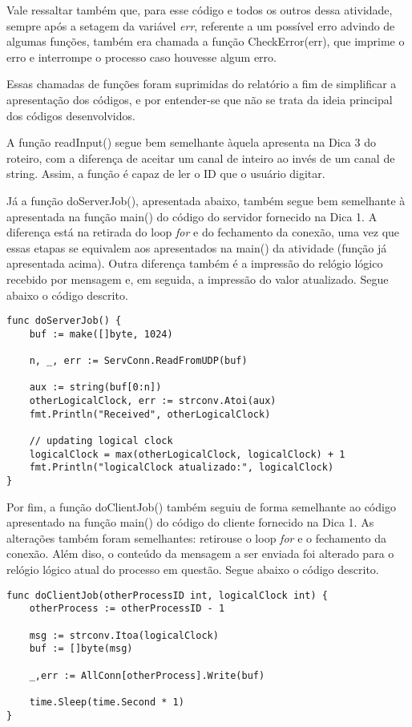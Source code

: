 \documentclass[conference]{IEEEtran}
\begin{document}
	Vale ressaltar também que, para esse código e todos os outros dessa atividade, sempre após a setagem da variável \textit{err}, referente a um possível erro advindo de algumas funções, também era chamada a função CheckError(err), que imprime o erro e interrompe o processo caso houvesse algum erro.
	
	Essas chamadas de funções foram suprimidas do relatório a fim de simplificar a apresentação dos códigos, e por entender-se que não se trata da ideia principal dos códigos desenvolvidos.
	
	A função readInput() segue bem semelhante àquela apresenta na Dica 3 do roteiro, com a diferença de aceitar um canal de inteiro ao invés de um canal de string. Assim, a função é capaz de ler o ID que o usuário digitar.
	
	Já a função doServerJob(), apresentada abaixo, também segue bem semelhante à apresentada na função main() do código do servidor fornecido na Dica 1. A diferença está na retirada do loop \textit{for} e do fechamento da conexão, uma vez que essas etapas se equivalem aos apresentados na main() da atividade (função já apresentada acima). Outra diferença também é a impressão do relógio lógico recebido por mensagem e, em seguida, a impressão do valor atualizado. Segue abaixo o código descrito.

\begin{lstlisting}
func doServerJob() {
	buf := make([]byte, 1024)

	n, _, err := ServConn.ReadFromUDP(buf)

	aux := string(buf[0:n])
	otherLogicalClock, err := strconv.Atoi(aux)
	fmt.Println("Received", otherLogicalClock)
	
	// updating logical clock
	logicalClock = max(otherLogicalClock, logicalClock) + 1
	fmt.Println("logicalClock atualizado:", logicalClock)
}
\end{lstlisting}

	Por fim, a função doClientJob() também seguiu de forma semelhante ao código apresentado na função main() do código do cliente fornecido na Dica 1. As alterações também foram semelhantes: retirouse o loop \textit{for} e o fechamento da conexão. Além diso, o conteúdo da mensagem a ser enviada foi alterado para o relógio lógico atual do processo em questão. Segue abaixo o código descrito.

\begin{lstlisting}
func doClientJob(otherProcessID int, logicalClock int) {
	otherProcess := otherProcessID - 1

	msg := strconv.Itoa(logicalClock)
	buf := []byte(msg)

	_,err := AllConn[otherProcess].Write(buf)

	time.Sleep(time.Second * 1)
}
\end{lstlisting}
\end{document}
